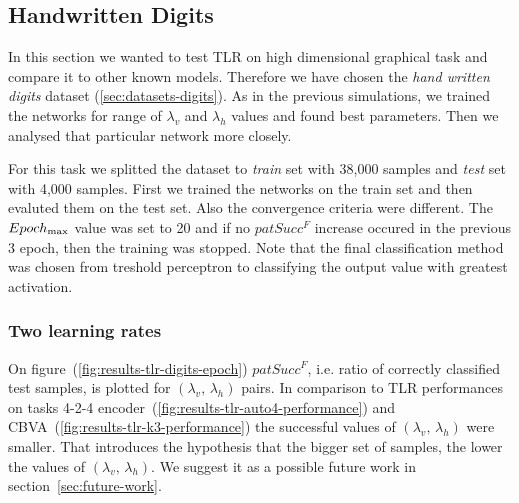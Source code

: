 

\subsection{Handwritten Digits} 
\label{sec:results-digits} 

In this section we wanted to test TLR on high dimensional graphical task and compare it to other known models. Therefore we have chosen the \emph{hand written digits} dataset (\ref{sec:datasets-digits}). As in the previous simulations, we trained the networks for range of $\lambda_v$ and $\lambda_h$ values and found best parameters. Then we analysed that particular network more closely. 

For this task we splitted the dataset to \emph{train} set with 38,000 samples and \emph{test} set with 4,000 samples. First we trained the networks on the train set and then evaluted them on the test set. Also the convergence criteria were different. The $Epoch_{\rm max}$ value was set to 20 and if no $patSucc^F$ increase occured in the previous 3 epoch, then the training was stopped. Note that the final classification method was chosen from treshold perceptron to classifying the output value with greatest activation. 

\subsubsection{Two learning rates} 
\label{sec:tlr-digits} 
On figure~(\ref{fig:results-tlr-digits-epoch}) $patSucc^F$, i.e. ratio of correctly classified test samples, is plotted for $(\lambda_v,\, \lambda_h)$ pairs. In comparison to TLR performances on tasks 4-2-4 encoder~(\ref{fig:results-tlr-auto4-performance}) and CBVA~(\ref{fig:results-tlr-k3-performance}) the successful values of $(\lambda_v,\, \lambda_h)$ were smaller. That introduces the hypothesis that the bigger set of samples, the lower the values of $(\lambda_v,\, \lambda_h)$. We suggest it as a possible future work in section~\ref{sec:future-work}. 

